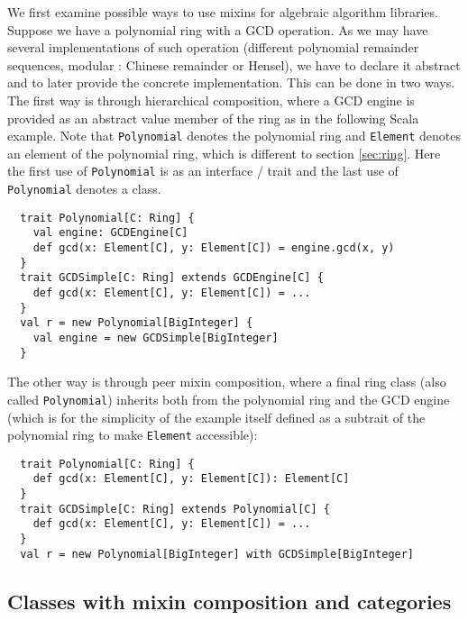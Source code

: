 \documentclass{llncs}
\newcommand{\code}[1]{\texttt{#1}}
\begin{document}
We first examine possible ways to use mixins for algebraic algorithm
libraries.  Suppose we have a polynomial ring with a GCD operation. As
we may have several implementations of such operation (different
polynomial remainder sequences, modular : Chinese remainder or
Hensel), we have to declare it abstract and to later provide the
concrete implementation. This can be done in two ways. The first way
is through hierarchical composition, where a GCD engine is provided as
an abstract value member of the ring as in the following Scala
example. Note that \code{Polynomial} denotes the polynomial ring and
\code{Element} denotes an element of the polynomial ring, which is
different to section \ref{sec:ring}.
Here the first use of \code{Poly\-nomial} is as an interface / trait
and the last use of \code{Poly\-nomial} denotes a class.
%
\begin{verbatim}
  trait Polynomial[C: Ring] {
    val engine: GCDEngine[C]
    def gcd(x: Element[C], y: Element[C]) = engine.gcd(x, y)
  }
  trait GCDSimple[C: Ring] extends GCDEngine[C] {
    def gcd(x: Element[C], y: Element[C]) = ...
  }
  val r = new Polynomial[BigInteger] {
    val engine = new GCDSimple[BigInteger]
  }
\end{verbatim}
%
The other way is through peer mixin composition, where a final ring
class (also called \code{Polynomial}) inherits both from the
polynomial ring and the GCD engine (which is for the simplicity of the
example itself defined as a subtrait of the polynomial ring to make
\code{Element} accessible):
%
\begin{verbatim}
  trait Polynomial[C: Ring] {
    def gcd(x: Element[C], y: Element[C]): Element[C]
  }
  trait GCDSimple[C: Ring] extends Polynomial[C] {
    def gcd(x: Element[C], y: Element[C]) = ...
  }
  val r = new Polynomial[BigInteger] with GCDSimple[BigInteger]
\end{verbatim}


\subsection{Classes with mixin composition and categories} %
\end{document}
